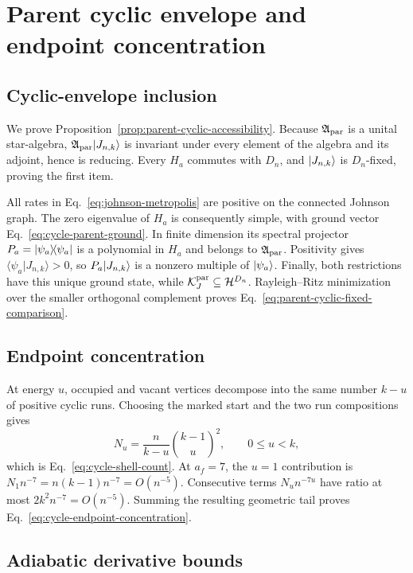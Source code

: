 \section{Parent cyclic envelope and endpoint concentration}

\subsection{Cyclic-envelope inclusion}
\label{app:parent-accessibility}

We prove Proposition~\ref{prop:parent-cyclic-accessibility}.  Because
$\mathfrak A_{\rm par}$ is a unital star-algebra,
$\mathfrak A_{\rm par}\lvert J_{n,k}\rangle$ is invariant under every element of
the algebra and its adjoint, hence is reducing.  Every $H_a$ commutes with
$D_n$, and $\lvert J_{n,k}\rangle$ is $D_n$-fixed, proving the first item.

All rates in Eq.~\eqref{eq:johnson-metropolis} are positive on the connected
Johnson graph.  The zero eigenvalue of $H_a$ is consequently simple, with
ground vector Eq.~\eqref{eq:cycle-parent-ground}.  In finite dimension its
spectral projector $P_a=\lvert\psi_a\rangle\!\langle\psi_a\rvert$ is a polynomial in
$H_a$ and belongs to $\mathfrak A_{\rm par}$.  Positivity gives
$\langle\psi_a|J_{n,k}\rangle>0$, so
$P_a\lvert J_{n,k}\rangle$ is a nonzero multiple of $\lvert\psi_a\rangle$.  Finally, both
restrictions have this unique ground state, while
$\mathcal K_J^{\rm par}\subseteq\mathcal H^{D_n}$.  Rayleigh--Ritz
minimization over the smaller orthogonal complement proves
Eq.~\eqref{eq:parent-cyclic-fixed-comparison}.

\subsection{Endpoint concentration}
\label{app:parent-concentration}

At energy $u$, occupied and vacant vertices decompose into the same number
$k-u$ of positive cyclic runs.  Choosing the marked start and the two run
compositions gives
\begin{equation}
 N_u=\frac{n}{k-u}\binom{k-1}{u}^2,
 \qquad0\leq u<k,
\end{equation}
which is Eq.~\eqref{eq:cycle-shell-count}.  At $a_f=7$, the $u=1$
contribution is $N_1n^{-7}=n(k-1)n^{-7}=O(n^{-5})$.  Consecutive terms
$N_un^{-7u}$ have ratio at most $2k^2n^{-7}=O(n^{-5})$.  Summing the
resulting geometric tail proves
Eq.~\eqref{eq:cycle-endpoint-concentration}.

\subsection{Adiabatic derivative bounds}
\label{app:parent-adiabatic}

